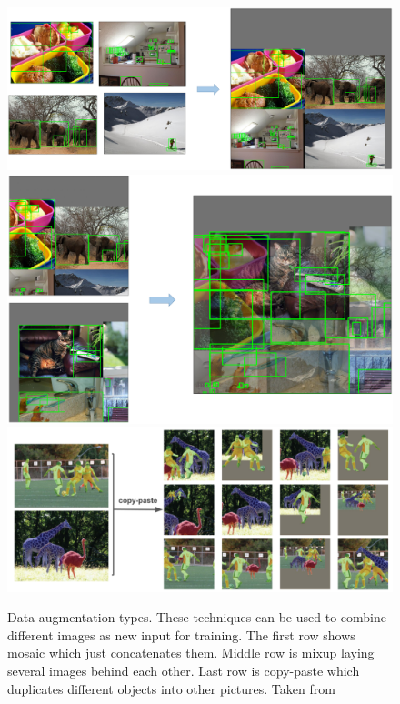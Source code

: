 \begin{figure}[htbp!]
	\centering
	\includegraphics[scale=0.18]{figures/mosaic.png}
	\hspace{40pt}
	\includegraphics[scale=0.18]{figures/mixup.png}
	\hspace{40pt}
	\includegraphics[scale=0.27]{figures/copy-paste.png}
	\caption{Data augmentation types. These techniques can be used to combine different images as new input for training. The first row shows mosaic which just concatenates them. Middle row is mixup laying several images behind each other. Last row is copy-paste which duplicates different objects into other pictures. Taken from \cite{yolov5}}
	\label{fig:augmentation}
\end{figure}

